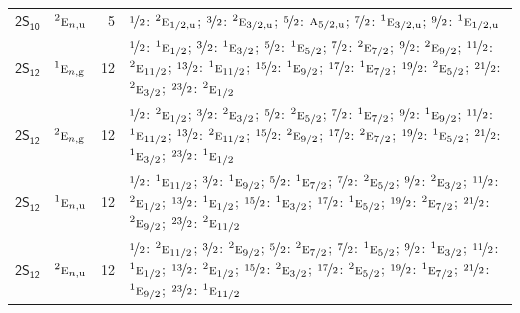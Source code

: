\documentclass[10pt,a4paper]{article}
\numberwithin{equation}{section}
\newcommand{\grp}[1]{\mathsf{#1}}
\newcommand{\irr}[1]{\text{\normalfont\scshape #1}}
\newcommand{\conjpair}[1]{{}^{#1}}
\newcommand{\ptag}[1]{\mathrm{#1}}
\newlength{\fillwidth}\newlength{\cellwidth}\newlength{\colwidth}
\begin{document}
{\begin{longtable}{@{}llr>{\RaggedRight\arraybackslash}p{\fillwidth}@{}}
\href{2S10.pdf}{$\grp{2S_{10}}$} & $\conjpair{2}\irr{e}_{n,\ptag{u}}$ & 5 & $\nicefrac{1}{2}$: $\conjpair{2}\irr{e}_{1/2,\ptag{u}}$; $\nicefrac{3}{2}$: $\conjpair{2}\irr{e}_{3/2,\ptag{u}}$; $\nicefrac{5}{2}$: $\irr{a}_{5/2,\ptag{u}}$; $\nicefrac{7}{2}$: $\conjpair{1}\irr{e}_{3/2,\ptag{u}}$; $\nicefrac{9}{2}$: $\conjpair{1}\irr{e}_{1/2,\ptag{u}}$\\
\href{2S12.pdf}{$\grp{2S_{12}}$} & $\conjpair{1}\irr{e}_{n,\ptag{g}}$ & 12 & $\nicefrac{1}{2}$: $\conjpair{1}\irr{e}_{1/2}$; $\nicefrac{3}{2}$: $\conjpair{1}\irr{e}_{3/2}$; $\nicefrac{5}{2}$: $\conjpair{1}\irr{e}_{5/2}$; $\nicefrac{7}{2}$: $\conjpair{2}\irr{e}_{7/2}$; $\nicefrac{9}{2}$: $\conjpair{2}\irr{e}_{9/2}$; $\nicefrac{11}{2}$: $\conjpair{2}\irr{e}_{11/2}$; $\nicefrac{13}{2}$: $\conjpair{1}\irr{e}_{11/2}$; $\nicefrac{15}{2}$: $\conjpair{1}\irr{e}_{9/2}$; $\nicefrac{17}{2}$: $\conjpair{1}\irr{e}_{7/2}$; $\nicefrac{19}{2}$: $\conjpair{2}\irr{e}_{5/2}$; $\nicefrac{21}{2}$: $\conjpair{2}\irr{e}_{3/2}$; $\nicefrac{23}{2}$: $\conjpair{2}\irr{e}_{1/2}$\\
\href{2S12.pdf}{$\grp{2S_{12}}$} & $\conjpair{2}\irr{e}_{n,\ptag{g}}$ & 12 & $\nicefrac{1}{2}$: $\conjpair{2}\irr{e}_{1/2}$; $\nicefrac{3}{2}$: $\conjpair{2}\irr{e}_{3/2}$; $\nicefrac{5}{2}$: $\conjpair{2}\irr{e}_{5/2}$; $\nicefrac{7}{2}$: $\conjpair{1}\irr{e}_{7/2}$; $\nicefrac{9}{2}$: $\conjpair{1}\irr{e}_{9/2}$; $\nicefrac{11}{2}$: $\conjpair{1}\irr{e}_{11/2}$; $\nicefrac{13}{2}$: $\conjpair{2}\irr{e}_{11/2}$; $\nicefrac{15}{2}$: $\conjpair{2}\irr{e}_{9/2}$; $\nicefrac{17}{2}$: $\conjpair{2}\irr{e}_{7/2}$; $\nicefrac{19}{2}$: $\conjpair{1}\irr{e}_{5/2}$; $\nicefrac{21}{2}$: $\conjpair{1}\irr{e}_{3/2}$; $\nicefrac{23}{2}$: $\conjpair{1}\irr{e}_{1/2}$\\
\href{2S12.pdf}{$\grp{2S_{12}}$} & $\conjpair{1}\irr{e}_{n,\ptag{u}}$ & 12 & $\nicefrac{1}{2}$: $\conjpair{1}\irr{e}_{11/2}$; $\nicefrac{3}{2}$: $\conjpair{1}\irr{e}_{9/2}$; $\nicefrac{5}{2}$: $\conjpair{1}\irr{e}_{7/2}$; $\nicefrac{7}{2}$: $\conjpair{2}\irr{e}_{5/2}$; $\nicefrac{9}{2}$: $\conjpair{2}\irr{e}_{3/2}$; $\nicefrac{11}{2}$: $\conjpair{2}\irr{e}_{1/2}$; $\nicefrac{13}{2}$: $\conjpair{1}\irr{e}_{1/2}$; $\nicefrac{15}{2}$: $\conjpair{1}\irr{e}_{3/2}$; $\nicefrac{17}{2}$: $\conjpair{1}\irr{e}_{5/2}$; $\nicefrac{19}{2}$: $\conjpair{2}\irr{e}_{7/2}$; $\nicefrac{21}{2}$: $\conjpair{2}\irr{e}_{9/2}$; $\nicefrac{23}{2}$: $\conjpair{2}\irr{e}_{11/2}$\\
\href{2S12.pdf}{$\grp{2S_{12}}$} & $\conjpair{2}\irr{e}_{n,\ptag{u}}$ & 12 & $\nicefrac{1}{2}$: $\conjpair{2}\irr{e}_{11/2}$; $\nicefrac{3}{2}$: $\conjpair{2}\irr{e}_{9/2}$; $\nicefrac{5}{2}$: $\conjpair{2}\irr{e}_{7/2}$; $\nicefrac{7}{2}$: $\conjpair{1}\irr{e}_{5/2}$; $\nicefrac{9}{2}$: $\conjpair{1}\irr{e}_{3/2}$; $\nicefrac{11}{2}$: $\conjpair{1}\irr{e}_{1/2}$; $\nicefrac{13}{2}$: $\conjpair{2}\irr{e}_{1/2}$; $\nicefrac{15}{2}$: $\conjpair{2}\irr{e}_{3/2}$; $\nicefrac{17}{2}$: $\conjpair{2}\irr{e}_{5/2}$; $\nicefrac{19}{2}$: $\conjpair{1}\irr{e}_{7/2}$; $\nicefrac{21}{2}$: $\conjpair{1}\irr{e}_{9/2}$; $\nicefrac{23}{2}$: $\conjpair{1}\irr{e}_{11/2}$\\

\end{longtable}}
\end{document}
